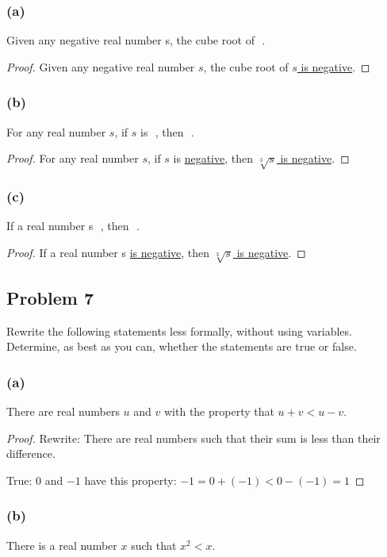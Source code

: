 \documentclass[14pt]{extarticle}
\newcommand{\fbl}{\underline{\hspace{1cm}}\,\,}
\begin{document}
\subsubsection{(a)}
Given any negative real number s, the cube root of \fbl.

\begin{proof}
Given any negative real number $s$, the cube root of
\underline{$s$ is negative}.
\end{proof}

\subsubsection{(b)}
For any real number $s$, if $s$ is \fbl, then \fbl.

\begin{proof}
For any real number $s$, if $s$ is \underline{negative}, then
 \underline{$\sqrt[3]{s}$ is negative}.
\end{proof}

\subsubsection{(c)}
If a real number s \fbl, then \fbl.

\begin{proof}
If a real number s \underline{is negative}, then \underline{$\sqrt[3]{s}$ is
negative}.
\end{proof}

\subsection{Problem 7}
Rewrite the following statements less formally, without using variables.
Determine, as best as you can, whether the statements are true or false.

\subsubsection{(a)}
There are real numbers $u$ and $v$ with the property that $u + v < u - v$.

\begin{proof}
Rewrite: There are real numbers such that their sum is less than their
difference.

True: $0$ and $-1$ have this property: $-1 = 0 + (-1) < 0 - (-1) = 1$
\end{proof}

\subsubsection{(b)}
There is a real number $x$ such that $x^2 < x$.
\end{document}
